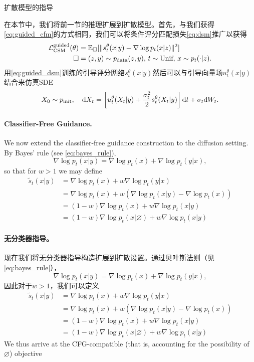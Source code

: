 扩散模型的指导

在本节中，我们将前一节的推理扩展到扩散模型。首先，与我们获得\cref{eq:guided_cfm}的方式相同，我们可以将条件评分匹配损失\cref{eq:dsm}推广以获得
\begin{align}
    \label{eq:guided_dsm}
    \mathcal{L}_{\text{CSM}}^{\text{guided}}(\theta) &= \mathbb{E}_{\square}[\|s_t^\theta(x|y) - \nabla\log p_t(x|z)\|^2]\\
    \square &= (z,y)\sim p_{\rm{data}}(z,y), \,t\sim \text{Unif},\,x\sim p_t(\cdot|z).
\end{align}
用\cref{eq:guided_dsm}训练的引导评分网络$s_t^\theta(x|y)$然后可以与引导向量场$u_t^\theta(x|y)$结合来仿真SDE
\begin{equation*}
    X_0 \sim p_{\rm{init}},\quad \mathrm{d} X_t = \left[u_t^\theta(X_t|y)+\frac{\sigma_t^2}{2}s_t^\theta(X_t|y)\right]\mathrm{d} t + \sigma_t\mathrm{d} W_t.
\end{equation*}

\paragraph{Classifier-Free Guidance.} We now extend the classifier-free guidance construction to the diffusion setting. By Bayes' rule (see \cref{eq:bayes_rule}),
\begin{equation*}
    \nabla \log p_t(x|y) = \nabla \log p_t(x) + \nabla \log p_t(y|x),
\end{equation*}
so that for  $w > 1$ we may define
\begin{align*}
    \tilde{s}_t(x|y) &= \nabla \log p_t(x) + w \nabla \log p_t(y|x)\\
                    &= \nabla \log p_t(x) + w (\nabla \log p_t(x|y) - \nabla \log p_t(x))\\
                    &= (1-w) \nabla \log p_t(x) + w \nabla \log p_t(x|y)\\
                    &= (1-w) \nabla \log p_t(x|\varnothing) + w \nabla \log p_t(x|y)
\end{align*}

\paragraph{无分类器指导。} 现在我们将无分类器指导构造扩展到扩散设置。通过贝叶斯法则（见\cref{eq:bayes_rule}），
\begin{equation*}
    \nabla \log p_t(x|y) = \nabla \log p_t(x) + \nabla \log p_t(y|x),
\end{equation*}
因此对于$w > 1$，我们可以定义
\begin{align*}
    \tilde{s}_t(x|y) &= \nabla \log p_t(x) + w \nabla \log p_t(y|x)\\
                    &= \nabla \log p_t(x) + w (\nabla \log p_t(x|y) - \nabla \log p_t(x))\\
                    &= (1-w) \nabla \log p_t(x) + w \nabla \log p_t(x|y)\\
                    &= (1-w) \nabla \log p_t(x|\varnothing) + w \nabla \log p_t(x|y)
\end{align*}
We thus arrive at the CFG-compatible (that is, accounting for the possibility of $\varnothing$) objective 

